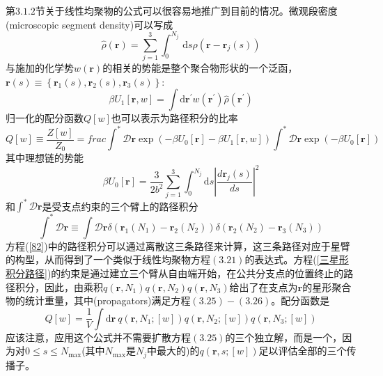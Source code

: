 第$3.1.2$节关于线性均聚物的公式可以很容易地推广到目前的情况。微观段密度(microscopic segment density)可以写成
\begin{equation}
\hat{\rho}(\mathbf{r})=\sum_{j=1}^3 \int_{0}^{N_j}\, \mathrm{d}s\rho(\mathbf{r}-\mathbf{r}_{j}(s))
\end{equation}
与施加的化学势$w (\mathbf{r})$的相关的势能是整个聚合物形状的一个泛函，$\mathbf{r}(s)\equiv \left\{ \mathbf{r}_1(s),\mathbf{r}_2(s),\mathbf{r}_3(s) \right\}:$
\begin{equation}
\beta U_1[\mathbf{r},w]=\int \mathrm{d}\mathbf{r}^{'}w(\mathbf{r}^{'})\hat{\rho}(\mathbf{r}^{'})
\end{equation}
归一化的配分函数$Q[w]$也可以表示为路径积分的比率
\begin{equation}
Q[w]\equiv \frac{Z[w]}{Z_0}=frac{\int^{*}\mathcal{D}\mathbf{r}\exp (-\beta U_0[\mathbf{r}]-\beta U_1[\mathbf{r},w])}{\int^{*}\mathcal{D}\mathbf{r}\exp (-\beta U_0[\mathbf{r}])} \label{82}
\end{equation}
其中理想链的势能
\begin{equation}
\beta U_0[\mathbf{r}]=\frac{3}{2b^2}\sum_{j=1}^3\int_{0}^{N_j} \mathrm{d}s\left| \frac{d\mathbf{r}_j(s)}{ds} \right|^2
\end{equation}
和$\int^{*}\mathcal{D}\mathbf{r}$是受支点约束的三个臂上的路径积分
\begin{equation}
\int^{*}\mathcal{D}\mathbf{r}\equiv \int \mathcal{D}\mathbf{r}\delta (\mathbf{r}_1(N_1)-\mathbf{r}_2(N_2))\delta (\mathbf{r}_2(N_2)-\mathbf{r}_3(N_3)) 
\end{equation}
方程(\ref{82})中的路径积分可以通过离散这三条路径来计算，这三条路径对应于星臂的构型，从而得到了一个类似于线性均聚物方程$(3.21)$的表达式。方程(\ref{三星形积分路径})的约束是通过建立三个臂从自由端开始，在公共分支点的位置终止的路径积分，因此，由乘积$q(\mathbf{r},N_1)q(\mathbf{r},N_2)q(\mathbf{r},N_3)$给出了在支点为$\mathbf{r}$的星形聚合物的统计重量，其中(propagators)满足方程$(3.25)-(3.26)$。配分函数是
\begin{equation}
Q[w]=\frac{1}{V}\int \mathrm{d}\mathbf{r}~q(\mathbf{r},N_1;[w])q(\mathbf{r},N_2;[w])q(\mathbf{r},N_3;[w])
\end{equation}
应该注意，应用这个公式并不需要扩散方程$(3.25)$的三个独立解，而是一个，因为对$0\leq s\leq N_{\max}$(其中$N_{\max}$是$N_j$中最大的)的$q(\mathbf{r},s;[w])$足以评估全部的三个传播子。

